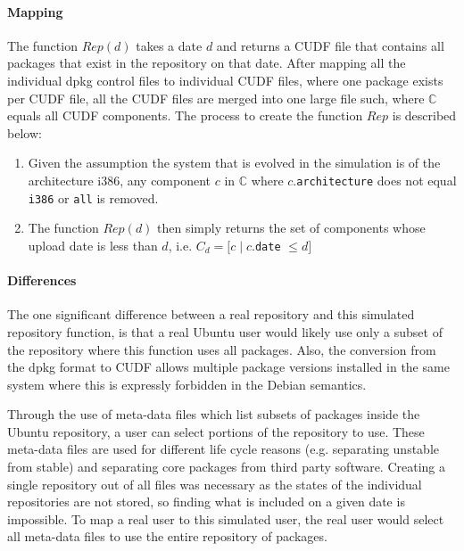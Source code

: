 \paragraph{Mapping}
The function $Rep(d)$ takes a date $d$ and returns a CUDF file that contains all packages that exist in the repository on that date.
After mapping all the individual dpkg control files to individual CUDF files, where one package exists per CUDF file,
all the CUDF files are merged into one large file such, where $\mathbb{C}$ equals all CUDF components.
The process to create the function $Rep$ is described below:
\begin{enumerate}
  \item Given the assumption the system that is evolved in the simulation is of the architecture i386, 
  any component $c$ in $\mathbb{C}$ where $c$.\verb+architecture+ does not equal \verb+i386+ or \verb+all+ is removed.
  \item The function $Rep(d)$ then simply returns the set of components whose upload date is less than $d$, i.e. $C_d = [c \mid c$.\verb+date+ $ \leq d]$
\end{enumerate}

\paragraph{Differences}
The one significant difference between a real repository and this simulated repository function,
is that a real Ubuntu user would likely use only a subset of the repository where this function uses all packages. 
Also, the conversion from the dpkg format to CUDF allows multiple package versions installed in the same system where this is expressly forbidden in the Debian semantics. 

Through the use of meta-data files which list subsets of packages inside the Ubuntu repository, a user can select portions of the repository to use.
These meta-data files are used for different life cycle reasons (e.g. separating unstable from stable) and separating core packages from third party software.
Creating a single repository out of all files was necessary as the states of the individual repositories are not stored,
so finding what is included on a given date is impossible.
To map a real user to this simulated user, the real user would select all meta-data files to use the entire repository of packages. 

